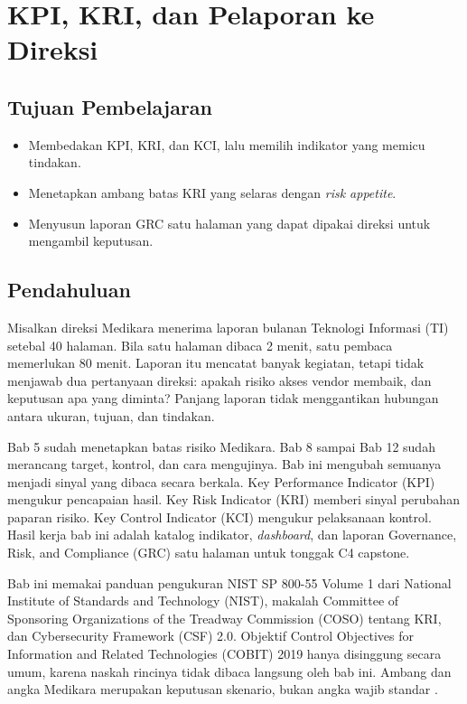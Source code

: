 \chapter{KPI, KRI, dan Pelaporan ke Direksi}

\section*{Tujuan Pembelajaran}
\begin{itemize}
  \item Membedakan KPI, KRI, dan KCI, lalu memilih indikator yang memicu tindakan.
  \item Menetapkan ambang batas KRI yang selaras dengan \textit{risk appetite}.
  \item Menyusun laporan GRC satu halaman yang dapat dipakai direksi untuk mengambil keputusan.
\end{itemize}

\section{Pendahuluan}

Misalkan direksi Medikara menerima laporan bulanan Teknologi Informasi (TI) setebal 40 halaman.
Bila satu halaman dibaca 2 menit, satu pembaca memerlukan 80 menit. Laporan itu mencatat banyak
kegiatan, tetapi tidak menjawab dua pertanyaan direksi: apakah risiko akses vendor membaik, dan
keputusan apa yang diminta? Panjang laporan tidak menggantikan hubungan antara ukuran, tujuan,
dan tindakan.

Bab 5 sudah menetapkan batas risiko Medikara. Bab 8 sampai Bab 12 sudah merancang target,
kontrol, dan cara mengujinya. Bab ini mengubah semuanya menjadi sinyal yang dibaca secara berkala.
Key Performance Indicator (KPI) mengukur pencapaian hasil. Key Risk Indicator (KRI) memberi sinyal
perubahan paparan risiko. Key Control Indicator (KCI) mengukur pelaksanaan kontrol. Hasil kerja
bab ini adalah katalog indikator, \textit{dashboard}, dan laporan Governance, Risk, and Compliance
(GRC) satu halaman untuk tonggak C4 capstone.

Bab ini memakai panduan pengukuran NIST SP 800-55 Volume 1 dari National Institute of Standards
and Technology (NIST), makalah Committee of Sponsoring Organizations of the Treadway Commission
(COSO) tentang KRI, dan Cybersecurity Framework (CSF) 2.0. Objektif Control Objectives for
Information and Related Technologies (COBIT) 2019 hanya disinggung secara umum, karena naskah
rincinya tidak dibaca langsung oleh bab ini. Ambang dan angka Medikara merupakan keputusan
skenario, bukan angka wajib standar \cite{c13-nist80055v1,c13-coso-kri,nistcsf2,c04-gmo}.

